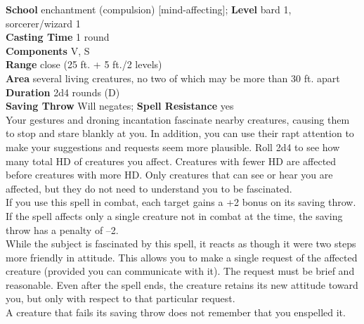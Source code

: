 \textbf{School} enchantment (compulsion) [mind-affecting]; \textbf{Level} bard 1, sorcerer/wizard 1\\
\textbf{Casting Time} 1 round\\
\textbf{Components} V, S\\
\textbf{Range} close (25 ft. + 5 ft./2 levels)\\
\textbf{Area} several living creatures, no two of which may be more than 30 ft. apart\\
\textbf{Duration} 2d4 rounds (D)\\
\textbf{Saving Throw }Will negates; \textbf{Spell Resistance} yes\\
Your gestures and droning incantation fascinate nearby creatures, causing them to stop and stare blankly at you. In addition, you can use their rapt attention to make your suggestions and requests seem more plausible. Roll 2d4 to see how many total HD of creatures you affect. Creatures with fewer HD are affected before creatures with more HD. Only creatures that can see or hear you are affected, but they do not need to understand you to be fascinated.\\
If you use this spell in combat, each target gains a +2 bonus on its saving throw. If the spell affects only a single creature not in combat at the time, the saving throw has a penalty of –2.\\
While the subject is fascinated by this spell, it reacts as though it were two steps more friendly in attitude. This allows you to make a single request of the affected creature (provided you can communicate with it). The request must be brief and reasonable. Even after the spell ends, the creature retains its new attitude toward you, but only with respect to that particular request.\\
A creature that fails its saving throw does not remember that you enspelled it.\\
